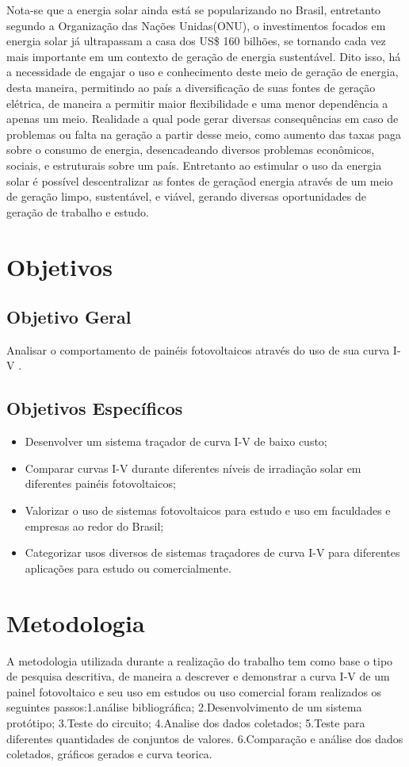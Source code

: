 \indent	Nota-se que a energia solar ainda está se popularizando no Brasil, entretanto segundo a Organização das Nações Unidas(ONU), o investimentos focados em energia solar já ultrapassam a casa dos US\$ 160 bilhões, se tornando cada vez mais importante em um contexto de geração de energia sustentável. Dito isso, há a necessidade de engajar o uso e conhecimento deste meio de geração de energia, desta maneira, permitindo ao país a diversificação de suas fontes de geração elétrica, de maneira a permitir maior flexibilidade e uma menor dependência a apenas um meio.
Realidade a qual pode gerar diversas consequências em caso de problemas ou falta na geração a partir desse meio, como aumento das taxas paga sobre o consumo de energia, desencadeando diversos problemas econômicos, sociais, e estruturais sobre um país. Entretanto ao estimular o uso da energia solar é possível descentralizar as fontes de geraçãod energia através de um meio de geração limpo, sustentável, e viável, gerando diversas oportunidades de geração de trabalho e estudo.


\section{Objetivos}

\subsection{Objetivo Geral}

Analisar o comportamento de painéis fotovoltaicos através do uso de sua curva I-V .

\subsection{Objetivos Específicos}
\begin{itemize}
	\item Desenvolver um sistema traçador de curva I-V de baixo custo;
	\item Comparar curvas I-V durante diferentes níveis de irradiação solar em diferentes painéis fotovoltaicos;
	\item Valorizar o uso de sistemas fotovoltaicos para estudo e uso em faculdades e empresas ao redor do Brasil;
	\item Categorizar usos diversos de sistemas traçadores de curva I-V para diferentes aplicações para estudo ou comercialmente.

\end{itemize}

\section{Metodologia}

A metodologia utilizada durante a realização do trabalho tem como base o tipo de pesquisa descritiva, de maneira a descrever e demonstrar a curva I-V de um painel fotovoltaico e seu uso em estudos ou uso comercial foram realizados os seguintes passos:1.análise bibliográfica; 2.Desenvolvimento de um sistema protótipo; 3.Teste do circuito; 4.Analise dos dados coletados; 5.Teste para diferentes quantidades de conjuntos de valores. 6.Comparação e análise dos dados coletados, gráficos gerados e curva teorica.
